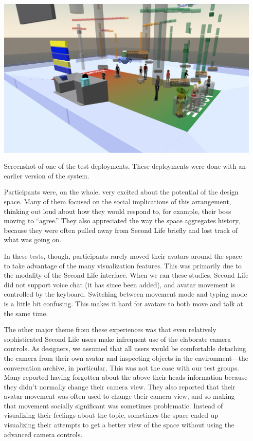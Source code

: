 \begin{marginfigure}
	\includegraphics{figures/meeting_space_trial_1.jpg}
	\caption{Screenshot of one of the test deployments. These deployments were done with an earlier version of the system.}
	\label{fig:meeting_space_trial_1}
\end{marginfigure}

Participants were, on the whole, very excited about the potential of the design space. Many of them focused on the social implications of this arrangement, thinking out loud about how they would respond to, for example, their boss moving to ``agree.'' They also appreciated the way the space aggregates history, because they were often pulled away from Second Life briefly and lost track of what was going on.

In these tests, though, participants rarely moved their avatars around the space to take advantage of the many visualization features. This was primarily due to the modality of the Second Life interface. When we ran these studies, Second Life did not support voice chat (it has since been added), and avatar movement is controlled by the keyboard. Switching between movement mode and typing mode is a little bit confusing. This makes it hard for avatars to both move and talk at the same time.


The other major theme from these experiences was that even relatively sophisticated Second Life users make infrequent use of the elaborate camera controls. As designers, we assumed that all users would be comfortable detaching the camera from their own avatar and inspecting objects in the environment---the conversation archive, in particular. This was not the case with our test groups. Many reported having forgotten about the above-their-heads information because they didn't normally change their camera view. They also reported that their avatar movement was often used to change their camera view, and so making that movement socially significant was sometimes problematic. Instead of visualizing their feelings about the topic, sometimes the space ended up visualizing their attempts to get a better view of the space without using the advanced camera controls.


